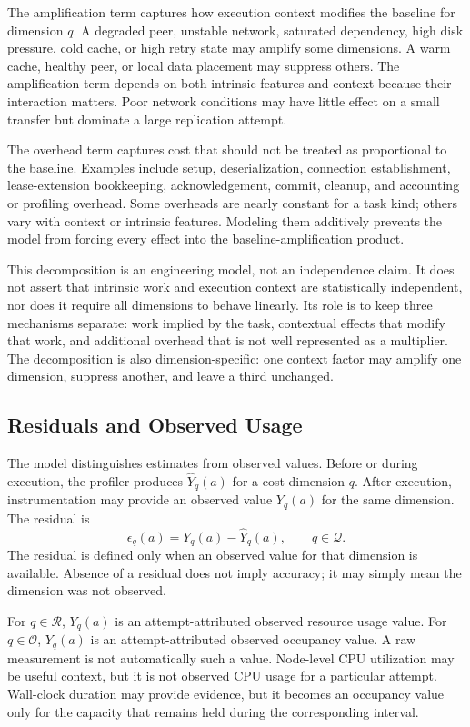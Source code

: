 The amplification term captures how execution context modifies the baseline for
dimension $q$. A degraded peer, unstable network, saturated dependency, high disk
pressure, cold cache, or high retry state may amplify some dimensions. A warm
cache, healthy peer, or local data placement may suppress others. The
amplification term depends on both intrinsic features and context because their
interaction matters. Poor network conditions may have little effect on a small
transfer but dominate a large replication attempt.

The overhead term captures cost that should not be treated as proportional to
the baseline. Examples include setup, deserialization, connection establishment,
lease-extension bookkeeping, acknowledgement, commit, cleanup, and accounting or
profiling overhead. Some overheads are nearly constant for a task kind; others
vary with context or intrinsic features. Modeling them additively prevents the
model from forcing every effect into the baseline-amplification product.

This decomposition is an engineering model, not an independence claim. It does
not assert that intrinsic work and execution context are statistically
independent, nor does it require all dimensions to behave linearly. Its role is
to keep three mechanisms separate: work implied by the task, contextual effects
that modify that work, and additional overhead that is not well represented as a
multiplier. The decomposition is also dimension-specific: one context factor may
amplify one dimension, suppress another, and leave a third unchanged.

\subsection{Residuals and Observed Usage}
\label{sec:cost-residuals-usage}

The model distinguishes estimates from observed values. Before or during
execution, the profiler produces $\widehat{Y}_q(a)$ for a cost dimension $q$.
After execution, instrumentation may provide an observed value $Y_q(a)$ for the
same dimension. The residual is
\[
\epsilon_q(a)
=
Y_q(a) - \widehat{Y}_q(a),
\qquad
q \in \mathcal{Q}.
\]
The residual is defined only when an observed value for that dimension is
available. Absence of a residual does not imply accuracy; it may simply mean the
dimension was not observed.

For $q \in \mathcal{R}$, $Y_q(a)$ is an attempt-attributed observed resource
usage value. For $q \in \mathcal{O}$, $Y_q(a)$ is an attempt-attributed observed
occupancy value. A raw measurement is not automatically such a value. Node-level
CPU utilization may be useful context, but it is not observed CPU usage for a
particular attempt. Wall-clock duration may provide evidence, but it becomes an
occupancy value only for the capacity that remains held during the corresponding
interval.

